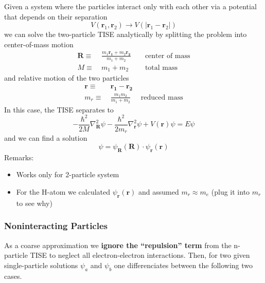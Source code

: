 Given a system where the particles interact only with each other via a potential that depends on their separation
\begin{equation*}
    V(\mathbf{r}_1,\mathbf{r}_2)\to V(|\mathbf{r}_1-\mathbf{r}_2|)
\end{equation*}
we can solve the two-particle TISE analytically by splitting the problem into center-of-mass motion
\begin{align*}
    \mathbf{R}\equiv\  & \frac{m_1\mathbf{r_1}+m_2\mathbf{r_2}}{m_1+m_2} &  & \text{ center of mass} \\
    M\equiv\           & m_1 + m_2                                       &  & \text{ total mass}
\end{align*}
and relative motion of the two particles
\begin{align*}
    \mathbf{r}\equiv\  & \mathbf{r_1}-\mathbf{r_2} &                      \\
    m_r\equiv\         & \frac{m_1 m_2}{m_1+m_2}   & \text{ reduced mass}
\end{align*}
In this case, the TISE separates to
\begin{equation*}
    -\frac{\hbar^{2}}{2M}\nabla_{\mathbf{R}}^{2}\psi-\frac{\hbar^{2}}{2m_r}\nabla_{\mathbf{r}}^{2}\psi+V(\mathbf{r})\psi=E\psi
\end{equation*}
and we can find a solution
\begin{equation*}
    \psi = \psi_\mathbf{R}(\mathbf{R})\cdot\psi_\mathbf{r}(\mathbf{r})
\end{equation*}
Remarks:
\begin{itemize}
    \item Works only for 2-particle system
    \item For the H-atom we calculated $\psi_\mathbf{r}(\mathbf{r})$ and assumed $m_r\approx m_e$ (plug it into $m_r$ to see why)
\end{itemize}

\subsubsection{Noninteracting Particles}\label{ssec:NIP}
As a coarse approximation we \textbf{ignore the ``repulsion'' term} from the n-particle TISE to neglect all electron-electron interactions. Then, for two given single-particle solutions $\psi_a$ and $\psi_b$ one differenciates between the following two cases.

\newpar{}

